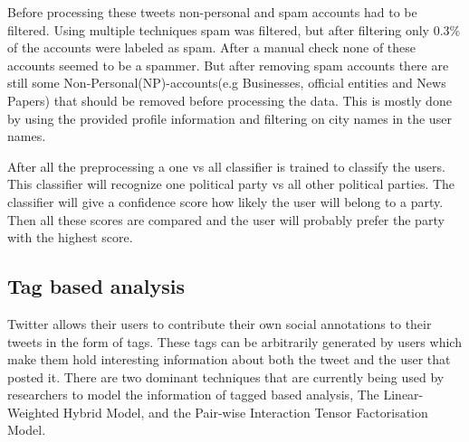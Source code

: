 \documentclass{article}
\begin{document}
Before processing these tweets non-personal and spam accounts had to be filtered. Using multiple techniques spam was filtered, but after filtering only 0.3\% of the accounts were labeled as spam. After a manual check none of these accounts seemed to be a spammer. But after removing spam accounts there are still some Non-Personal(NP)-accounts(e.g Businesses, official entities and News Papers)  that should be removed before processing the data. This is mostly done by using the provided profile information and filtering on city names in the user names.  \cite{pol}

After all the preprocessing a one vs all classifier is trained to classify the users. This classifier will recognize one political party vs all other political parties. The classifier will give a confidence score how likely the user will belong to a party. Then all these scores are compared and the user will probably prefer the party with the highest score.  \cite{pol}
\subsection{Tag based analysis}

Twitter allows their users to contribute their own social annotations to their tweets in the form of tags. These tags can be arbitrarily generated by users 
which make them hold interesting information about both the tweet and the user that posted it. There are two dominant techniques that are currently being
used by researchers to model the information of tagged based analysis, The Linear-Weighted Hybrid Model, and the Pair-wise Interaction Tensor Factorisation Model\cite{TagBased}.
\end{document}
